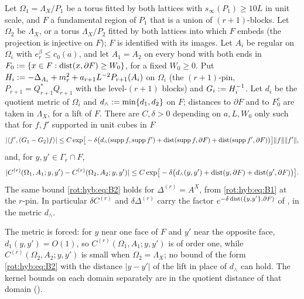 
\begin{lemma}\label{rot:hyb:lem:domdiff}
Let $\Omega_1=\Lambda_X/P_1$ be a torus fitted by both lattices with $s_\infty(P_1)\ge10L$ in unit scale, and $F$ a fundamental region of $P_1$ that is a union of $(r+1)$-blocks. Let $\Omega_2$ be $\Lambda_X$, or a torus $\Lambda_X/P_2$ fitted by both lattices into which $F$ embeds (the projection is injective on $F$); $F$ is identified with its images. Let $A_i$ be regular on $\Omega_i$ with $e_r^\beta\le c_0(a)$, and let $A_1=A_2$ on every bond with both ends in $F_0:=\{x\in F:\operatorname{dist}(x,\partial F)\ge W_0\}$, for a fixed $W_0\ge0$. Put $H_i:=-\Delta_{A_i}+m_r^2+a_{r+1}L^{-2}P_{r+1}(A_i)$ on $\Omega_i$ (the $(r+1)$-pin, $P_{r+1}=Q_{r+1}^*Q_{r+1}$ with the level-$(r+1)$ blocks) and $G_i:= H_i^{-1}$. Let $d_i$ be the quotient metric of $\Omega_i$ and $d_\wedge:=\min\{d_1,d_2\}$ on $F$; distances to $\partial F$ and to $F_0^c$ are taken in $\Lambda_X$, for a lift of $F$. There are $C,\delta>0$ depending on $a,L,W_0$ only such that for $f,f'$ supported in unit cubes in $F$
\begin{equation}\label{rot:hyb:eq:B1}
|\langle f',(G_1-G_2)f\rangle|\le C\exp\!\big[-\delta\big(d_\wedge(\operatorname{supp} f,\operatorname{supp} f')+\operatorname{dist}(\operatorname{supp} f,\partial F)+\operatorname{dist}(\operatorname{supp} f',\partial F)\big)\big]\|f\|\|f'\|,
\end{equation}
and, for $y,y'\in\Gamma_r\cap F$,
\begin{equation}\label{rot:hyb:eq:B2}
|C^{(r)}(\Omega_1,A_1;y,y')-C^{(r)}(\Omega_2,A_2;y,y')|\le C\exp\!\big[-\delta\big(d_\wedge(y,y')+\operatorname{dist}(y,\partial F)+\operatorname{dist}(y',\partial F)\big)\big].
\end{equation}
The same bound \eqref{rot:hyb:eq:B2} holds for $\Delta^{(r)}=A^X$, from \eqref{rot:hyb:eq:B1} at the $r$-pin. In particular $\delta C^{(r)}$ and $\delta\Delta^{(r)}$ carry the factor $e^{-\delta\operatorname{dist}(\{y,y'\},\partial F)}$ of \cite[Thm.~3.3]{K1}, in the metric $d_\wedge$.
\end{lemma}

The metric is forced: for $y$ near one face of $F$ and $y'$ near the opposite face, $d_1(y,y')=O(1)$, so $C^{(r)}(\Omega_1,A_1;y,y')$ is of order one, while $C^{(r)}(\Omega_2,A_2;y,y')$ is small when $\Omega_2=\Lambda_X$; no bound of the form \eqref{rot:hyb:eq:B2} with the distance $|y-y'|$ of the lift in place of $d_\wedge$ can hold. The kernel bounds on each domain separately are in the quotient distance of that domain ().

